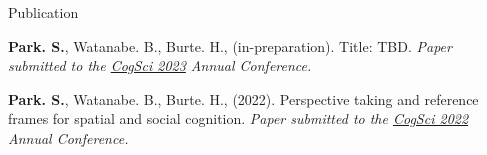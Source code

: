 \documentclass{resume} %
\begin{document}
\begin{rSection}{Publication}
	\setlength{\hangingindent}{1.27cm}
    
    \begin{hangingpar}
        
        \textbf{Park. S.}, Watanabe. B., Burte. H., (in-preparation). 
        Title: TBD. 
        \em{Paper submitted to the
            \href{https://cognitivesciencesociety.org/cogsci-2023/}{CogSci 
            2023} Annual Conference.}
        
    \end{hangingpar}
	
	\begin{hangingpar}
		
		\textbf{Park. S.}, Watanabe. B., Burte. H., (2022). 
		Perspective taking and reference frames for spatial and social cognition. 
		\em{Paper submitted to the
			\href{https://cognitivesciencesociety.org/cogsci-2022/}{CogSci 2022} Annual Conference.}
		
	\end{hangingpar}
	
\end{rSection}
\end{document}
